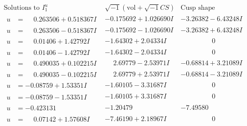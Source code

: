 \documentclass[1p]{elsarticle_modified}
\theoremstyle{definition}
\newcommand{\I}{\sqrt{-1}}
\begin{document}
$$\begin{array}{c|c|c}
\text{Solutions to }I^u_{1}& \I (\text{vol} + \sqrt{-1}CS) & \text{Cusp shape}\\
 \hline 
\begin{aligned}
u &= \phantom{-}0.263506 + 0.518367 I\end{aligned}
 & -0.175692 + 1.026690 I & -3.26382 - 6.43248 I \\ \hline\begin{aligned}
u &= \phantom{-}0.263506 - 0.518367 I\end{aligned}
 & -0.175692 - 1.026690 I & -3.26382 + 6.43248 I \\ \hline\begin{aligned}
u &= \phantom{-}0.01406 + 1.42792 I\end{aligned}
 & -1.64302 + 2.04334 I & \phantom{-0.000000 } 0 \\ \hline\begin{aligned}
u &= \phantom{-}0.01406 - 1.42792 I\end{aligned}
 & -1.64302 - 2.04334 I & \phantom{-0.000000 } 0 \\ \hline\begin{aligned}
u &= \phantom{-}0.490035 + 0.102215 I\end{aligned}
 & \phantom{-}2.69779 - 2.53971 I & -0.68814 + 3.21089 I \\ \hline\begin{aligned}
u &= \phantom{-}0.490035 - 0.102215 I\end{aligned}
 & \phantom{-}2.69779 + 2.53971 I & -0.68814 - 3.21089 I \\ \hline\begin{aligned}
u &= -0.08759 + 1.53351 I\end{aligned}
 & -1.60105 - 3.31687 I & \phantom{-0.000000 } 0 \\ \hline\begin{aligned}
u &= -0.08759 - 1.53351 I\end{aligned}
 & -1.60105 + 3.31687 I & \phantom{-0.000000 } 0 \\ \hline\begin{aligned}
u &= -0.423131\phantom{ +0.000000I}\end{aligned}
 & -1.20479\phantom{ +0.000000I} & -7.49580\phantom{ +0.000000I} \\ \hline\begin{aligned}
u &= \phantom{-}0.07142 + 1.57608 I\end{aligned}
 & -7.46190 + 2.18967 I & \phantom{-0.000000 } 0 \\ \hline\begin{aligned}

\end{aligned}
\end{array}$$
\end{document}

